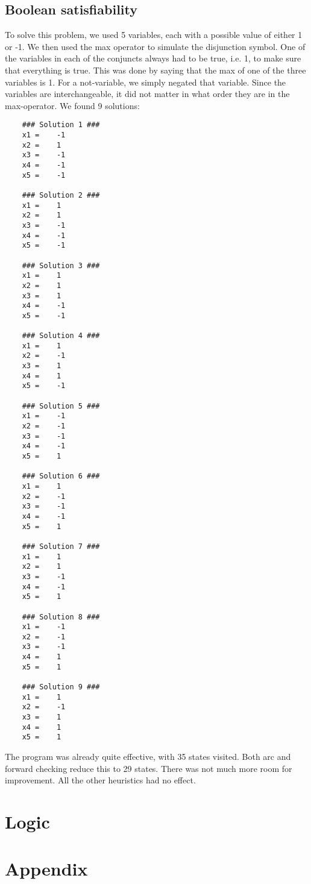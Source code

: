 \documentclass{article}
\begin{document}
	\subsection*{Boolean satisfiability}
	
	To solve this problem, we used 5 variables, each with a possible value of either 1 or -1. We then used the max operator to simulate the disjunction symbol. One of the variables in each of the conjuncts always had to be true, i.e. 1, to make sure that everything is true. This was done by saying that the max of one of the three variables is 1. For a not-variable, we simply negated that variable. Since the variables are interchangeable, it did not matter in what order they are in the max-operator. We found 9 solutions:
	
	\begin{lstlisting}
	### Solution 1 ###
	x1 = 	-1 
	x2 = 	1 
	x3 = 	-1 
	x4 = 	-1 
	x5 = 	-1 
	
	### Solution 2 ###
	x1 = 	1 
	x2 = 	1 
	x3 = 	-1 
	x4 = 	-1 
	x5 = 	-1 
	
	### Solution 3 ###
	x1 = 	1 
	x2 = 	1 
	x3 = 	1 
	x4 = 	-1 
	x5 = 	-1 
	
	### Solution 4 ###
	x1 = 	1 
	x2 = 	-1 
	x3 = 	1 
	x4 = 	1 
	x5 = 	-1 
	
	### Solution 5 ###
	x1 = 	-1 
	x2 = 	-1 
	x3 = 	-1 
	x4 = 	-1 
	x5 = 	1 
	
	### Solution 6 ###
	x1 = 	1 
	x2 = 	-1 
	x3 = 	-1 
	x4 = 	-1 
	x5 = 	1 
	
	### Solution 7 ###
	x1 = 	1 
	x2 = 	1 
	x3 = 	-1 
	x4 = 	-1 
	x5 = 	1 
	
	### Solution 8 ###
	x1 = 	-1 
	x2 = 	-1 
	x3 = 	-1 
	x4 = 	1 
	x5 = 	1 
	
	### Solution 9 ###
	x1 = 	1 
	x2 = 	-1 
	x3 = 	1 
	x4 = 	1 
	x5 = 	1 
	\end{lstlisting}
	
	The program was already quite effective, with 35 states visited. Both arc and forward checking reduce this to 29 states. There was not much more room for improvement. All the other heuristics had no effect.
	
	\section{Logic}
	
	
	\section{Appendix}
\end{document}
